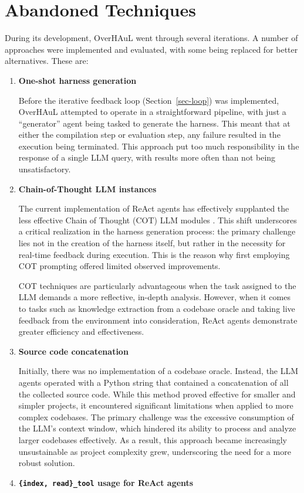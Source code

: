 \documentclass[
  a4paper,
]{scrreprt}
\theoremstyle{definition}
\theoremstyle{remark}
\begin{document}

\printbibliography[heading=none]

\cleardoublepage
{}
{}
\appendix

\chapter{Abandoned Techniques}\label{sec-abandoned}

During its development, OverHAuL went through several iterations. A
number of approaches were implemented and evaluated, with some being
replaced for better alternatives. These are:

\begin{enumerate}
\def\labelenumi{\arabic{enumi}.}
\item
  \textbf{One-shot harness generation}

  Before the iterative feedback loop (Section~\ref{sec-loop}) was
  implemented, OverHAuL attempted to operate in a straightforward
  pipeline, with just a ``generator'' agent being tasked to generate the
  harness. This meant that at either the compilation step or evaluation
  step, any failure resulted in the execution being terminated. This
  approach put too much responsibility in the response of a single LLM
  query, with results more often than not being unsatisfactory.
\item
  \textbf{Chain-of-Thought LLM instances}

  The current implementation of ReAct agents has effectively supplanted
  the less effective Chain of Thought (COT) LLM modules
  \autocite{chainofthought}. This shift underscores a critical
  realization in the harness generation process: the primary challenge
  lies not in the creation of the harness itself, but rather in the
  necessity for real-time feedback during execution. This is the reason
  why first employing COT prompting offered limited observed
  improvements.

  COT techniques are particularly advantageous when the task assigned to
  the LLM demands a more reflective, in-depth analysis. However, when it
  comes to tasks such as knowledge extraction from a codebase oracle and
  taking live feedback from the environment into consideration, ReAct
  agents demonstrate greater efficiency and effectiveness.
\item
  \textbf{Source code concatenation}

  Initially, there was no implementation of a codebase oracle. Instead,
  the LLM agents operated with a Python string that contained a
  concatenation of all the collected source code. While this method
  proved effective for smaller and simpler projects, it encountered
  significant limitations when applied to more complex codebases. The
  primary challenge was the excessive consumption of the LLM's context
  window, which hindered its ability to process and analyze larger
  codebases effectively. As a result, this approach became increasingly
  unsustainable as project complexity grew, underscoring the need for a
  more robust solution.
\item
  \textbf{\texttt{\{index,\ read\}\_tool} usage for ReAct agents}


\end{enumerate}
\end{document}
